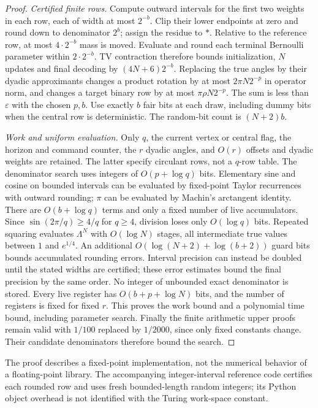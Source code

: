 \begin{proof}
\emph{Certified finite rows.}
Compute outward intervals for the first two weights in each row, each
of width at most $2^{-b}$. Clip their lower endpoints at zero and round
down to denominator $2^b$; assign the residue to $*$. Relative to the
reference row, at most $4\cdot2^{-b}$ mass is moved. Evaluate and round
each terminal Bernoulli parameter within $2\cdot2^{-b}$. TV contraction
therefore bounds initialization, $N$ updates and final decoding by
$(4N+6)2^{-b}$. Replacing the true angles by their dyadic approximants
changes a product rotation by at most $2\pi N2^{-p}$ in operator norm,
and changes a target binary row by at most $\pi\rho N2^{-p}$.
The sum is less than $\varepsilon$ with the chosen $p,b$.
Use exactly $b$ fair bits at each draw, including dummy bits when the
central row is deterministic. The random-bit count is $(N+2)b$.

\emph{Work and uniform evaluation.}
Only $q$, the current vertex or central flag, the horizon and command
counter, the $r$ dyadic angles, and $O(r)$ offsets and dyadic weights
are retained. The latter specify circulant rows, not a $q$-row table.
The denominator search uses integers of $O(p+\log q)$ bits.
Elementary sine and cosine on bounded intervals can be evaluated by
fixed-point Taylor recurrences with outward rounding; $\pi$ can be
evaluated by Machin's arctangent identity. There are $O(b+\log q)$
terms and only a fixed number of live accumulators. Since
$\sin(2\pi/q)\ge4/q$ for $q\ge4$, division loses only $O(\log q)$
bits. Repeated squaring evaluates $\Lambda^N$ with $O(\log N)$ stages,
all intermediate true values between $1$ and $e^{1/4}$.
An additional $O(\log(N+2)+\log(b+2))$ guard bits bounds accumulated
rounding errors. Interval precision can instead be doubled until the
stated widths are certified; these error estimates bound the final
precision by the same order. No integer of unbounded exact denominator
is stored. Every live register has
$O(b+p+\log N)$ bits, and the number of registers is fixed for fixed
$r$. This proves the work bound and a polynomial time bound, including
parameter search. Finally the finite arithmetic upper proofs remain
valid with $1/100$ replaced by $1/2000$, since only fixed constants
change. Their candidate denominators therefore bound the search.
\end{proof}

The proof describes a fixed-point implementation, not the numerical
behavior of a floating-point library. The accompanying integer-interval
reference code certifies each rounded row and uses fresh bounded-length
random integers; its Python object overhead is not identified with the
Turing work-space constant.

